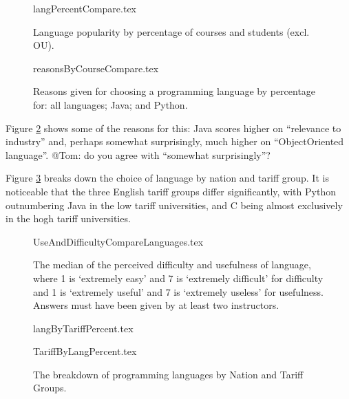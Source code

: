 \documentclass{sig-alternate}
\begin{document}
\begin{figure}
\begin{center}
{langPercentCompare.tex}
\end{center}\vskip-12pt
\caption{Language popularity by percentage of courses and students (excl. OU).\label{fig:lang}}
\end{figure}

\begin{figure}
\begin{center}
{reasonsByCourseCompare.tex}
\end{center}
\caption{Reasons given for choosing a programming language by percentage for: all languages; Java; and Python.\label{fig:reasons}}
\end{figure}
\par
Figure \ref{fig:reasons} shows some of the reasons for this: Java scores higher on ``relevance to industry'' and, perhaps somewhat surprisingly, much higher on ``ObjectOriented language''.  @Tom: do you agree with ``somewhat surprisingly''?

Figure \ref{fig;LangTariff} breaks down the choice of language by nation and tariff group.  It is noticeable that the three English tariff groups differ significantly, with Python outnumbering Java in the low tariff universities, and C being almost exclusively in the hogh tariff universities.

\begin{figure}
\begin{center}
{UseAndDifficultyCompareLanguages.tex}
\end{center}
\caption{The median of the perceived difficulty and usefulness of language, where 1 is `extremely easy' and 7 is `extremely difficult' for difficulty and 1 is `extremely useful' and 7 is `extremely useless' for usefulness.  Answers must have been given by at least two instructors.}
\end{figure}

\begin{figure}
\begin{center}
{langByTariffPercent.tex}
\end{center}
%
\begin{center}
{TariffByLangPercent.tex}
\end{center}
\caption{The breakdown of programming languages by Nation and Tariff Groups.\label{fig;LangTariff}}
\end{figure}
\end{document}
